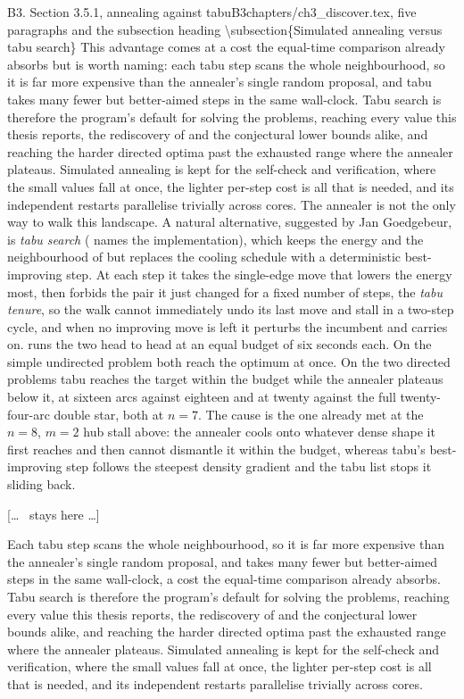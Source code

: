 \begin{offcutrewrite}{B3. Section 3.5.1, annealing against tabu}{B3}{chapters/ch3\_discover.tex, five paragraphs and }{the subsection heading \textbackslash{}subsection\{Simulated annealing versus tabu search\}}
This advantage comes at a cost the equal-time comparison already absorbs but is worth naming: each tabu step scans the whole neighbourhood, so it is far more expensive than the annealer's single random proposal, and tabu takes many fewer but better-aimed steps in the same wall-clock. Tabu search is therefore the program's default for solving the problems, reaching every value this thesis reports, the rediscovery of  and the conjectural lower bounds alike, and reaching the harder directed optima past the exhausted range where the annealer plateaus. Simulated annealing is kept for the self-check and verification, where the small values fall at once, the lighter per-step cost is all that is needed, and its independent restarts parallelise trivially across cores.
\nowreads
The annealer is not the only way to walk this landscape. A natural alternative, suggested by Jan Goedgebeur, is \emph{tabu search} ( names the implementation), which keeps the energy and the neighbourhood of  but replaces the cooling schedule with a deterministic best-improving step. At each step it takes the single-edge move that lowers the energy most, then forbids the pair it just changed for a fixed number of steps, the \emph{tabu tenure}, so the walk cannot immediately undo its last move and stall in a two-step cycle, and when no improving move is left it perturbs the incumbent and carries on.  runs the two head to head at an equal budget of six seconds each. On the simple undirected problem both reach the optimum at once. On the two directed problems tabu reaches the target within the budget while the annealer plateaus below it, at sixteen arcs against eighteen and at twenty against the full twenty-four-arc double star, both at $n = 7$. The cause is the one already met at the $n = 8$, $m = 2$ hub stall above: the annealer cools onto whatever dense shape it first reaches and then cannot dismantle it within the budget, whereas tabu's best-improving step follows the steepest density gradient and the tabu list stops it sliding back.

[\dots\  stays here \dots]

Each tabu step scans the whole neighbourhood, so it is far more expensive than the annealer's single random proposal, and takes many fewer but better-aimed steps in the same wall-clock, a cost the equal-time comparison already absorbs. Tabu search is therefore the program's default for solving the problems, reaching every value this thesis reports, the rediscovery of  and the conjectural lower bounds alike, and reaching the harder directed optima past the exhausted range where the annealer plateaus. Simulated annealing is kept for the self-check and verification, where the small values fall at once, the lighter per-step cost is all that is needed, and its independent restarts parallelise trivially across cores.
\end{offcutrewrite}

